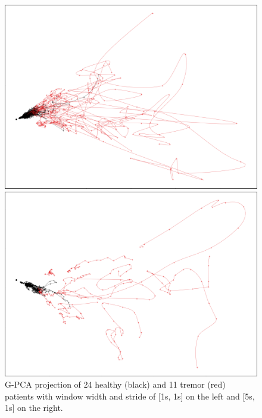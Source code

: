 \begin{figure}
\centering
\begin{minipage}{.5\textwidth}
    \centering
    \includegraphics[width=\linewidth]{figures/nemo/exp1.png}
\end{minipage}%
\begin{minipage}{.5\textwidth}
    \centering
    \includegraphics[width=\linewidth]{figures/nemo/exp1-5s-window.png}
\end{minipage}
\caption{G-PCA projection of 24 healthy (black) and 11 tremor (red) patients with window width and stride of [1s, 1s] on the left and [5s, 1s] on the right.}
\label{fig:exp1-gpca}
\end{figure}


